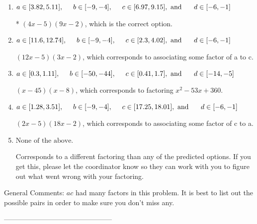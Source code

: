 \documentclass{article}[14pt]
\begin{document}
\begin{enumerate}[label=\Alph*.] 
\item $ a \in [3.82, 5.11], \hspace*{5mm} b \in [-9, -4], \hspace*{5mm} c \in [6.97, 9.15], \text{ and } \hspace*{5mm} d \in [-6, -1] $ 

 * $(4x -5)(9x -2)$, which is the correct option. 
\item $ a \in [11.6, 12.74], \hspace*{5mm} b \in [-9, -4], \hspace*{5mm} c \in [2.3, 4.02], \text{ and } \hspace*{5mm} d \in [-6, -1] $ 

  $(12x -5)(3x -2)$, which corresponds to associating some factor of a to c. 
\item $ a \in [0.3, 1.11], \hspace*{5mm} b \in [-50, -44], \hspace*{5mm} c \in [0.41, 1.7], \text{ and } \hspace*{5mm} d \in [-14, -5] $ 

  $(x -45)(x -8)$, which corresponds to factoring $x^{2} -53 x + 360$. 
\item $ a \in [1.28, 3.51], \hspace*{5mm} b \in [-9, -4], \hspace*{5mm} c \in [17.25, 18.01], \text{ and } \hspace*{5mm} d \in [-6, -1] $ 

  $(2x -5)(18x -2)$, which corresponds to associating some factor of c to a. 
\item $ \text{None of the above.} $ 

  Corresponds to a different factoring than any of the predicted options. If you get this, please let the coordinator know so they can work with you to figure out what went wrong with your factoring. 
\end{enumerate} 
 
General Comments: $ac$ had many factors in this problem. It is best to list out the possible pairs in order to make sure you don't miss any.

-----------------------------------------------
\end{document}
